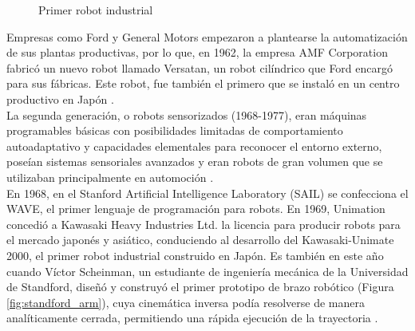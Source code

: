   \begin{figure}[H]
    \begin{center}
      \subcapcentertrue
      \hspace{2mm}
    \end{center}
    \caption{Primer robot industrial}
    \label{fig:primer_robot_industrial}
  \end{figure}
  
Empresas como Ford y General Motors empezaron a plantearse la automatización de sus plantas productivas, por lo que, en 1962, la empresa AMF Corporation fabricó un nuevo robot llamado Versatan, un robot cilíndrico que Ford encargó para sus fábricas. Este robot, fue también el primero que se instaló en un centro productivo en Japón \cite{Gasparetto19}. \\

La segunda generación, o robots sensorizados (1968-1977), eran máquinas programables básicas con posibilidades limitadas de comportamiento autoadaptativo y capacidades elementales para reconocer el entorno externo, poseían sistemas sensoriales avanzados y eran robots de gran volumen que se utilizaban principalmente en automoción \cite{Zamalloa17}. \\

En 1968, en el Stanford Artificial Intelligence Laboratory (SAIL) se confecciona el WAVE, el primer lenguaje de programación para robots. En 1969, Unimation concedió a Kawasaki Heavy Industries Ltd. la licencia para producir robots para el mercado japonés y asiático, conduciendo al desarrollo del Kawasaki-Unimate 2000, el primer robot industrial construido en Japón. Es también en este año cuando Víctor Scheinman, un estudiante de ingeniería mecánica de la Universidad de Standford, diseñó y construyó el primer prototipo de brazo robótico (Figura \ref{fig:standford_arm}), cuya cinemática inversa podía resolverse de manera analíticamente cerrada, permitiendo una rápida ejecución de la trayectoria \cite{Gasparetto19}. \\

